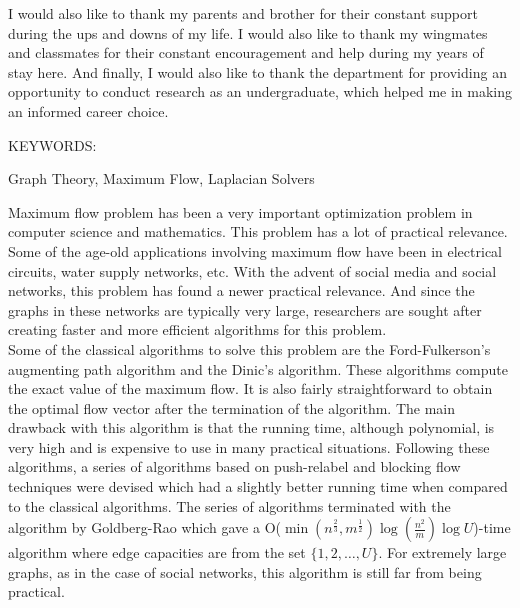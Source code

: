 \documentclass[BTech]{iitmdiss}
\begin{document}
  I would also like to thank my parents and brother for their constant support during the ups and downs of my life. I would also like to thank 
  my wingmates and classmates for their constant encouragement and help during my years of stay here. And finally, I would also like to thank the department
  for providing an opportunity to conduct research as an undergraduate, which helped me in making an informed career choice.


\abstract

\noindent KEYWORDS: \hspace*{0.5em} \parbox[t]{4.4in}{Graph Theory,
Maximum Flow, Laplacian Solvers }

\vspace*{24pt}

Maximum flow problem has been a very important optimization problem in computer science and mathematics. This problem has a lot of practical relevance.
Some of the age-old applications involving maximum flow have been in electrical circuits, water supply networks, etc. With the advent of social media
and social networks, this problem has found a newer practical relevance. And since the graphs in these networks are typically very large,
researchers are sought after creating faster and more efficient algorithms for this problem. \\

Some of the classical algorithms to solve this problem are the Ford-Fulkerson's augmenting path algorithm and the Dinic's algorithm. These algorithms
compute the exact value of the maximum flow. It is also fairly straightforward to obtain the optimal flow vector after the termination of the
algorithm. The main drawback with this algorithm is that the running time, although polynomial, is very high and is expensive to use in many practical
situations. Following these algorithms, a series of algorithms based on push-relabel and blocking flow techniques were devised which had a slightly better running time when compared to the 
classical algorithms. The series of algorithms terminated with the algorithm by Goldberg-Rao which gave a O($\min(n^{\frac{2}{3}},m^{\frac{1}{2}}) \log(\frac{n^2}{m}) \log U$)-time algorithm
where edge capacities are from the set $\{1,2,\ldots,U\}$. For 
extremely large graphs, as in the case of social networks, this algorithm is still far from being practical. \\
\end{document}
